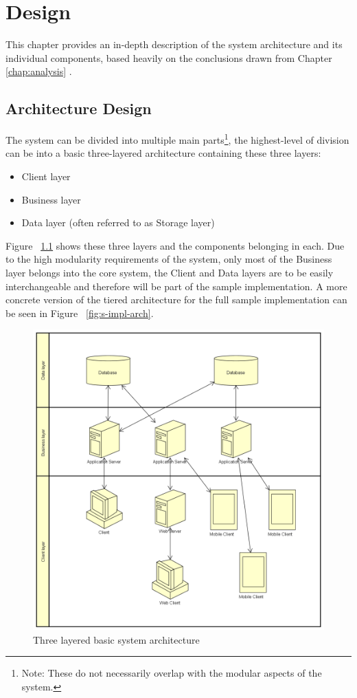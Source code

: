 \chapter{Design}
This chapter provides an in-depth description of the system architecture and its individual components, based heavily on the conclusions drawn from Chapter \ref{chap:analysis} .

\section{Architecture Design}
The system can be divided into multiple main parts\footnote{Note: These do not necessarily overlap with the modular aspects of the system.}, the highest-level of division can be into a basic  three-layered architecture containing these three layers:
\begin{itemize}
\item Client layer
\item Business layer
\item Data layer (often referred to as Storage layer)
\end{itemize}

Figure ~\ref{fig:layer-arch} shows these three layers and the components belonging in each. Due to the high modularity requirements of the system, only most of the Business layer belongs into the core system, the Client and Data layers are to be easily interchangeable and therefore will be part of the sample implementation. A more concrete version of the tiered architecture for the full sample implementation can be seen in Figure ~\ref{fig:s-impl-arch}.

\begin{figure}[H]
	\centering
	\includegraphics[width=1\textwidth]{figures/03_design/layer-arch}
    \caption{Three layered basic system architecture}
    \label{fig:layer-arch}
\end{figure}

